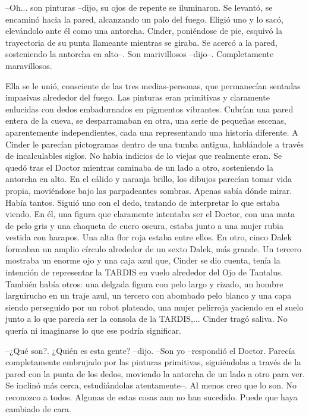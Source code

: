 --Oh... son pinturas --dijo, su ojos de repente se iluminaron. Se levantó, se encaminó hacia la pared, alcanzando un palo del fuego. Eligió uno y lo sacó, elevándolo ante él como una antorcha. Cinder, poniéndose de pie, esquivó la trayectoria de su punta llameante mientras se giraba. Se acercó a la pared, sosteniendo la antorcha en alto--. Son marivillosos --dijo--. Completamente maravillosos.

Ella se le unió, consciente de las tres medias-personas, que permanecían sentadas impasivas alrededor del fuego.
Las pinturas eran primitivas y claramente enlucidas con dedos embadurnados en pigmentos vibrantes. Cubrían una pared entera de la cueva, se desparramaban en otra, una serie de pequeñas escenas, aparentemente independientes, cada una representando una historia diferente. A Cinder le parecían pictogramas dentro de una tumba antigua, hablándole a través de incalculables siglos. No había indicios de lo viejas que realmente eran.
Se quedó tras el Doctor mientras caminaba de un lado a otro, sosteniendo la antorcha en alto. En el cálido y naranja brillo, los dibujos parecían tomar vida propia, moviéndose bajo las parpadeantes sombras. Apenas sabía dónde mirar. Había tantos. Siguió uno con el dedo, tratando de interpretar lo que estaba viendo.
En él, una figura que claramente intentaba ser el Doctor, con una mata de pelo gris y una chaqueta de cuero oscura, estaba junto a una mujer rubia vestida con harapos. Una alta flor roja estaba entre ellos.
En otro, cinco Dalek formaban un amplio círculo alrededor de un sexto Dalek, más grande.
Un tercero mostraba un enorme ojo y una caja azul que, Cinder se dio cuenta, tenía la intención de representar la TARDIS en vuelo alrededor del Ojo de Tantalus.
También había otros: una delgada figura con pelo largo y rizado, un hombre larguirucho en un traje azul, un tercero con abombado pelo blanco y una capa siendo perseguido por un robot plateado, una mujer pelirroja yaciendo en el suelo junto a lo que parecía ser la consola de la TARDIS,...
Cinder tragó saliva. No quería ni imaginarse lo que ese podría significar. 

--¿Qué son?. ¿Quién es esta gente? --dijo.
--Son yo --respondió el Doctor. Parecía completamente embrujado por las pinturas primitivas, siguiéndolas a través de la pared con la punta de los dedos, moviendo la antorcha de un lado a otro para ver. Se inclinó más cerca, estudiándolas atentamente--. Al menos creo que lo son. No reconozco a todos. Algunas de estas cosas aun no han sucedido. Puede que haya cambiado de cara.


